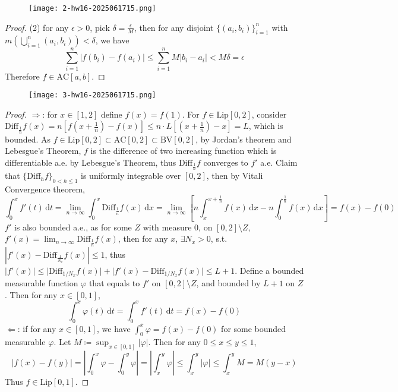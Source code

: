 \begin{exercise}[12 (2)]
\begin{figure}[H]
\centering
\texttt{[image: 2-hw16-2025061715.png]}
\label{}
\end{figure}\label{73e14c}
\end{exercise}

\begin{proof}
(2) for any $\epsilon>0$, pick $\delta=\frac{\epsilon}{M}$, then for any disjoint $\{ (a_i,b_i) \}_{i=1}^{n}$ with $m\left( \bigcup_{i=1}^{n}(a_i,b_i) \right)<\delta$, we have
\[
\sum_{i=1}^{n} \lvert f(b_i)-f(a_i) \rvert \leq \sum_{i=1}^{n} M\lvert b_i-a_i \rvert < M\delta=\epsilon
\]
Therefore $f\in\text{AC}[a,b]$.
\end{proof}

\begin{exercise}
\begin{figure}[H]
\centering
\texttt{[image: 3-hw16-2025061715.png]}
\label{}
\end{figure}
\end{exercise}
\begin{proof}
$\Rightarrow$: for $x\in[1,2]$ define $f (x)=f(1)$. For $f\in\text{Lip}[0,2]$, consider $\text{Diff}_{\frac{1}{n}}f(x)=n\left[ f\left( x+\frac{1}{n} \right)-f(x) \right]\leq n\cdot L\left[ \left( x+\frac{1}{n} \right)-x \right]=L$, which is bounded. As $f\in\text{Lip}[0,2]\subset\text{AC}[0,2]\subset\text{BV}[0,2]$, by Jordan's theorem and Lebesgue's Theorem, $f$ is the difference of two increasing function which is differentiable a.e. by Lebesgue's Theorem, thus $\text{Diff}_{\frac{1}{n}}f$ converges to $f'$ a.e. Claim that $\{ \text{Diff}_{h}f \}_{0<h\leq1}$ is uniformly integrable over $[0,2]$, then by Vitali Convergence theorem,
\[
\int_{0}^{x} f'(t) \, \mathrm{d}t=\lim_{ n \to \infty } \int_{0}^{x} \text{Diff}_{\frac{1}{n}}f(x) \, \mathrm{d}x =\lim_{ n \to \infty }\left[ n \int_{x}^{x+\frac{1}{n}} f(x) \, \mathrm{d}x-n\int_{0}^{\frac{1}{n}} f(x) \, \mathrm{d}x  \right] =f(x)-f(0)
\]
$f'$ is also bounded a.e., as for some $Z$ with measure 0, on $[0,2]\setminus Z$, $f'(x)=\lim_{ n \to \infty }\text{Diff}_{\frac{1}{n}}f(x)$, then for any $x$, $\exists N_{x}>0$, s.t. $\left\lvert  f'(x)-\text{Diff}_{\frac{1}{N_{x}}}f(x)  \right\rvert\leq1$, thus $\lvert f'(x) \rvert\leq \lvert \text{Diff}_{1/N_{x}}f(x) \rvert+\lvert f'(x)-\text{Diff}_{1/N_{x}}f(x) \rvert\leq L+1$. Define a bounded measurable function $\varphi$ that equals to $f'$ on $[0,2]\setminus Z$, and bounded by $L+1$ on $Z$. Then for any $x\in[0,1]$,
\[
\int_{0}^{x} \varphi(t) \, \mathrm{d}t = \int_{0}^{x} f'(t) \, \mathrm{d}t =f(x)-f(0)
\]
$\Leftarrow$: if for any $x\in[0,1]$, we have $\int_{0}^{x}\varphi=f(x)-f(0)$ for some bounded measurable $\varphi$. Let $M\coloneqq \sup_{x\in[0,1]}\lvert \varphi \rvert$. Then for any $0\leq x\leq y\leq1$,
\[
\lvert f(x)-f(y) \rvert =\left\lvert  \int_{0}^{x} \varphi-\int_{0}^{y} \varphi  \right\rvert =\left\lvert  \int_{x}^{y} \varphi  \right\rvert \leq \int_{x}^{y} \lvert \varphi \rvert \leq \int_{x}^{y} M=M(y-x)
\]
Thus $f\in\text{Lip}[0,1]$.
\end{proof}

